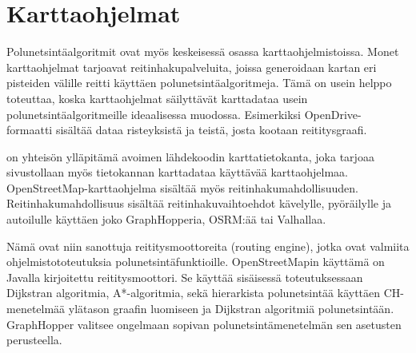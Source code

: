 \section{Karttaohjelmat}\label{karttaohjelmat}
Polunetsintäalgoritmit ovat myös keskeisessä osassa karttaohjelmistoissa. 
Monet karttaohjelmat tarjoavat reitinhakupalveluita, joissa generoidaan kartan  
eri pisteiden välille reitti käyttäen polunetsintäalgoritmeja. Tämä on usein 
helppo toteuttaa, koska karttaohjelmat säilyttävät karttadataa usein 
polunetsintäalgoritmeille ideaalisessa muodossa. Esimerkiksi OpenDrive-
formaatti sisältää dataa risteyksistä ja teistä, josta kootaan 
reititysgraafi\cite{Lanelet2}. \par
	\textcite{OpenStreetMap} on yhteisön ylläpitämä avoimen lähdekoodin 
karttatietokanta, joka tarjoaa sivustollaan myös tietokannan karttadataa 
käyttävää karttaohjelmaa\cite{OSMAbout}. OpenStreetMap-karttaohjelma sisältää 
myös reitinhakumahdollisuuden. Reitinhakumahdollisuus sisältää 
reitinhakuvaihtoehdot kävelylle, pyöräilylle ja autoilulle käyttäen joko 
GraphHopperia, OSRM:ää tai Valhallaa\cite{OpenStreetMap}. \par
	Nämä ovat niin sanottuja reititysmoottoreita (routing engine), jotka 
ovat valmiita ohjelmistototeutuksia polunetsintäfunktioille\cite{graphhopper}. 
OpenStreetMapin käyttämä \textcite{graphhopper} on Javalla kirjoitettu 
reititysmoottori. Se käyttää sisäisessä toteutuksessaan Dijkstran algoritmia, 
A*-algoritmia, sekä hierarkista polunetsintää käyttäen CH-menetelmää ylätason 
graafin luomiseen ja Dijkstran algoritmiä polunetsintään. GraphHopper valitsee 
ongelmaan sopivan polunetsintämenetelmän sen asetusten perusteella.


